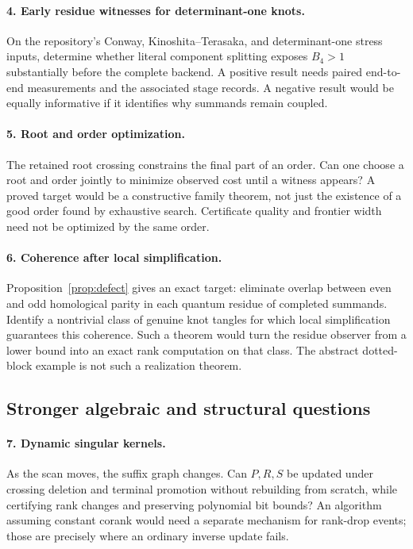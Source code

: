 \documentclass[11pt]{article}
\theoremstyle{definition}
\theoremstyle{remark}
\begin{document}
\paragraph{4. Early residue witnesses for determinant-one knots.}
On the repository's Conway, Kinoshita--Terasaka, and determinant-one stress
inputs, determine whether literal component splitting exposes $B_4>1$
substantially before the complete backend. A positive result needs paired
end-to-end measurements and the associated stage records. A negative result
would be equally informative if it identifies why summands remain coupled.

\paragraph{5. Root and order optimization.}
The retained root crossing constrains the final part of an order. Can one
choose a root and order jointly to minimize observed cost until a witness
appears? A proved target would be a constructive family theorem, not just
the existence of a good order found by exhaustive search. Certificate
quality and frontier width need not be optimized by the same order.

\paragraph{6. Coherence after local simplification.}
Proposition~\ref{prop:defect} gives an exact target: eliminate overlap between
even and odd homological parity in each quantum residue of completed
summands. Identify a nontrivial class of genuine knot tangles for which
local simplification guarantees this coherence. Such a theorem would turn
the residue observer from a lower bound into an exact rank computation on
that class. The abstract dotted-block example is not such a realization
theorem.

\subsection{Stronger algebraic and structural questions}
\paragraph{7. Dynamic singular kernels.}
As the scan moves, the suffix graph changes. Can $P,R,S$ be updated under
crossing deletion and terminal promotion without rebuilding from scratch,
while certifying rank changes and preserving polynomial bit bounds? An
algorithm assuming constant corank would need a separate mechanism for
rank-drop events; those are precisely where an ordinary inverse update
fails.
\end{document}
